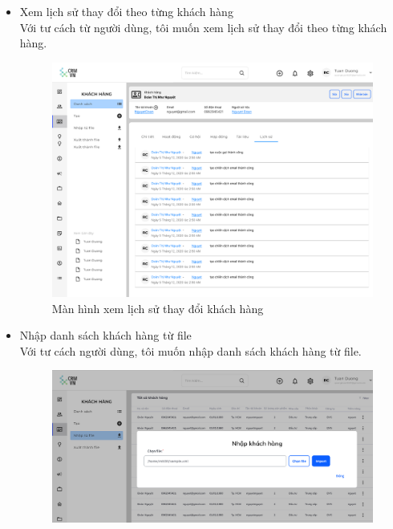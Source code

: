 \documentclass[12pt,a4paper]{article}
\begin{document}
\begin{enumerate}
\begin{itemize}
            \item Xem lịch sử thay đổi theo từng khách hàng
            \\Với tư cách từ người dùng, tôi muốn xem lịch sử thay đổi theo từng khách hàng.
            \begin{figure}[H]
                \centering \includegraphics[width=\textwidth]{Img/Nguyet/Khachhang/lichsuKH.png}
                \vspace{0.5cm}
                \caption{Màn hình xem lịch sử thay đổi khách hàng}
                \label{lichsuKH}
            \end{figure}
            \item Nhập danh sách khách hàng từ file
            \\Với tư cách người dùng, tôi muốn nhập danh sách khách hàng từ file.
            \begin{figure}[H]
                \centering \includegraphics[width=\textwidth]{Img/Nguyet/Khachhang/importKH.png}
                \vspace{0.5cm}

\end{figure}
\end{itemize}
\end{enumerate}
\end{document}
